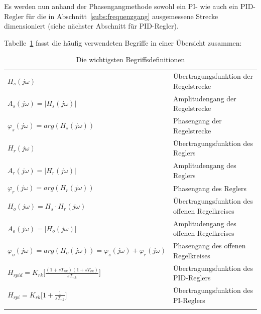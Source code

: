 Es  werden nun  anhand  der  Phasengangmethode sowohl  ein  PI-  wie auch  ein
PID-Regler f\"ur die in Abschnitt~\ref{subs:frequenzgang} ausgemessene Strecke
dimensioniert (siehe n\"achster Abschnitt f\"ur PID-Regler).

Tabelle~\ref{tab:terms}  fasst  die  h\"aufig verwendeten  Begriffe  in  einer
\"Ubersicht zusammen:

\begin{longtable}{lp{60mm}}
    \toprule
    \endhead
    \endfoot
    \endlastfoot


    $H_s(j\omega)                                                                   $ &  \"Ubertragungsfunktion der Regelstrecke \\
    $A_s(j\omega)=|H_s(j\omega)|                                                    $ &  Amplitudengang der Regelstrecke \\
    $\varphi_s(j\omega)=arg(H_s(j\omega))                                           $ &  Phasengang der Regelstrecke \\
    $H_r(j\omega)                                                                   $ &  \"Ubertragungsfunktion des Reglers \\
    $A_r(j\omega)=|H_r(j\omega)|                                                    $ &  Amplitudengang des Reglers \\
    $\varphi_r(j\omega)=arg(H_r(j\omega))                                           $ &  Phasengang des Reglers \\
    $H_o(j\omega)=H_s \cdot H_r(j\omega)                                            $ &  \"Ubertragungsfunktion des offenen Regelkreises \\
    $A_o(j\omega)=|H_o(j\omega)|                                                    $ &  Amplitudengang des offenen Regelkreises \\
    $\varphi_o(j\omega)=arg(H_o(j\omega))=\varphi_s(j\omega)+\varphi_r(j\omega)     $ &  Phasengang des offenen Regelkreises \\
    $H_{rpid}= K_{rk}\Big[ \frac{(1+sT_{nk})(1+sT_{vk})}{sT_{nk}}\Big]              $ & \"Ubertragungsfunktion des PID-Reglers \\
    $H_{rpi} = K_{rk}\Big[ 1 + \frac{1}{sT_{nk}} \Big]                              $ & \"Ubertragungsfunktion des PI-Reglers \\

    \bottomrule
    \caption{Die wichtigsten Begriffsdefinitionen}
    \label{tab:terms}
\end{longtable}


